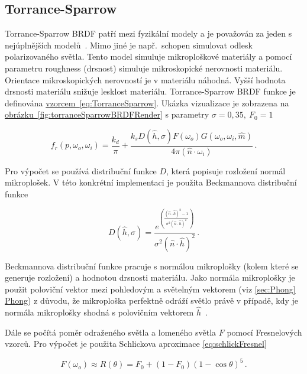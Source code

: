 \documentclass[czech,master]{diploma}
\newcommand{\uvec}[1]{\hat{#1}}
\newcommand{\point}{p}
\newcommand{\brdf}{f_r\left(\point,\omega_{o},\omega_{i}\right)}
\newcommand{\normVec}{\uvec{n}}
\newcommand{\normMicroVec}{\uvec{m}}
\newcommand{\inVec}{\omega_{i}}
\newcommand{\outVec}{\omega_{o}}
\newcommand{\halfVec}{\uvec{h}}
\newcommand{\rough}{\sigma}
\newcommand{\Fzero}{F_0}
\begin{document}
\subsection{Torrance-Sparrow} \label{sec:torrancesparrow}
Torrance-Sparrow BRDF patří mezi fyzikální modely a je považován za jeden s nejúplnějších modelů~\cite{BRDFOverview}. Mimo jiné je např.\ schopen simulovat odlesk polarizovaného světla. Tento model simuluje mikroploškové materiály a pomocí parametru roughness (drsnost) simuluje mikroskopické nerovnosti materiálu. Orientace mikroskopických nerovností je v materiálu náhodná. Vyšší hodnota drsnosti materiálu snižuje lesklost materiálu. Torrance-Sparrow BRDF funkce je definována \hyperref[eq:TorranceSparrow]{vzorcem~\ref{eq:TorranceSparrow}}. Ukázka vizualizace je zobrazena na \hyperref[fig:torranceSparrowBRDFRender]{obrázku~\ref{fig:torranceSparrowBRDFRender}} s parametry \(\rough=0{,}35,~\Fzero = 1\)\par

\begin{equation}\label{eq:TorranceSparrow}
  \brdf  =  \frac{k_d}{\pi} + \frac{k_s D(\halfVec,\rough) F(\outVec) G(\outVec,\inVec, \normMicroVec)}{4\pi (\normVec \cdot \inVec)}\,.
\end{equation}

Pro výpočet se používá distribuční funkce \(D\), která popisuje rozložení normál mikroplošek. V této konkrétní implementaci je použita Beckmannova distribuční funkce

\begin{equation}\label{eq:beckDistr}
  D(\halfVec,\rough)  =  \frac{e^{\left(\frac{(\normVec\cdot \halfVec)^{2}-1}{\rough^{2}(\normVec \cdot \halfVec)^{2}}\right)}}{\rough^2(\normVec\cdot \halfVec)^{2}}\,.
\end{equation}

Beckmannova distribuční funkce pracuje s normálou mikroplošky (kolem které se generuje rozložení) a hodnotou drsnosti materiálu. Jako normála mikroplošky je použit poloviční vektor mezi pohledovým a světelným vektorem (viz \hyperref[sec:Phong]{\ref{sec:Phong} Phong}) z důvodu, že mikroploška perfektně odráží světlo právě v případě, kdy je normála mikroplošky shodná s polovičním vektorem \(\halfVec\)~\cite{PHARR2017507}.\par
Dále se počítá poměr odraženého světla a lomeného světla \(F\) pomocí Fresnelových vzorců. Pro výpočet je použita Schlickova aproximace \hyperref[eq:schlickFresnel]{\ref{eq:schlickFresnel}}~\cite{SchlickFresnel}

\begin{equation}\label{eq:schlickFresnel}
  F(\outVec)  \approx R(\theta) = \Fzero + {(1-\Fzero)}{(1-\cos\theta)}^{5}\,.
\end{equation}
\end{document}
